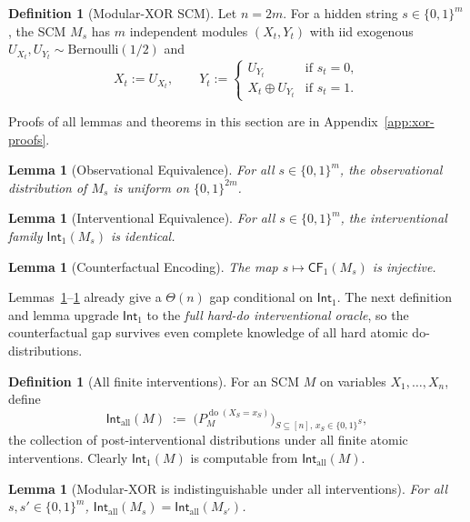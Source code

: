 \documentclass{article}
\theoremstyle{plain}
\newtheorem{lemma}[theorem]{Lemma}
\theoremstyle{definition}
\newtheorem{definition}[theorem]{Definition}
\newcommand{\Int}{\mathsf{Int}}
\newcommand{\CF}{\mathsf{CF}}
\DeclareMathOperator{\doop}{do}
\begin{document}
\begin{definition}[Modular-XOR SCM]
\label{def:xor-scm}
Let $n = 2m$. For a hidden string $s \in \{0,1\}^m$, the SCM $M_s$ has $m$ independent modules $(X_t, Y_t)$ with iid exogenous $U_{X_t}, U_{Y_t} \sim \mathrm{Bernoulli}(1/2)$ and
\[
X_t := U_{X_t}, \qquad Y_t := \begin{cases} U_{Y_t} & \text{if } s_t = 0, \\ X_t \oplus U_{Y_t} & \text{if } s_t = 1. \end{cases}
\]
\end{definition}

Proofs of all lemmas and theorems in this section are in Appendix~\ref{app:xor-proofs}.

\begin{lemma}[Observational Equivalence]
\label{lem:xor-obs}
For all $s \in \{0,1\}^m$, the observational distribution of $M_s$ is uniform on $\{0,1\}^{2m}$.
\end{lemma}


\begin{lemma}[Interventional Equivalence]
\label{lem:xor-int}
For all $s \in \{0,1\}^m$, the interventional family $\Int_1(M_s)$ is identical.
\end{lemma}


\begin{lemma}[Counterfactual Encoding]
\label{lem:xor-cf}
The map $s \mapsto \CF_1(M_s)$ is injective.
\end{lemma}


Lemmas~\ref{lem:xor-obs}--\ref{lem:xor-cf} already give a $\Theta(n)$ gap conditional on $\Int_1$. The next definition and lemma upgrade $\Int_1$ to the \emph{full hard-do interventional oracle}, so the counterfactual gap survives even complete knowledge of all hard atomic do-distributions.

\begin{definition}[All finite interventions]
\label{def:int-all}
For an SCM $M$ on variables $X_1, \ldots, X_n$, define
\[
    \Int_{\mathrm{all}}(M) \;:=\; \bigl( P_M^{\doop(X_S = x_S)} \bigr)_{S \subseteq [n],\, x_S \in \{0,1\}^{S}},
\]
the collection of post-interventional distributions under all finite atomic interventions. Clearly $\Int_1(M)$ is computable from $\Int_{\mathrm{all}}(M)$.
\end{definition}

\begin{lemma}[Modular-XOR is indistinguishable under all interventions]
\label{lem:xor-all-int}
For all $s, s' \in \{0,1\}^m$, $\Int_{\mathrm{all}}(M_s) = \Int_{\mathrm{all}}(M_{s'})$.
\end{lemma}
\end{document}
